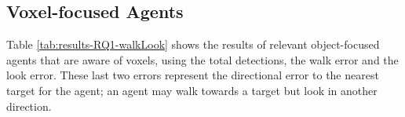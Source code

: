     


\newpage
\subsection{Voxel-focused Agents}\label{appendix:RQ1-results-noknowledgeofvoxels}

Table \ref{tab:results-RQ1-walkLook} shows the results of relevant object-focused agents that are aware of voxels, using the total detections, the walk error and the look error. These last two errors represent the directional error to the nearest target for the agent; an agent may walk towards a target but look in another direction.
